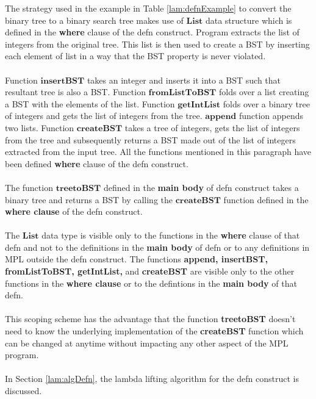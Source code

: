 \documentclass[11pt]{article}
\begin{document}
The strategy used in the example in Table \ref {lam:defnExample} to convert the binary tree to a binary search tree makes 
use of $\mathbf{List}$ data structure which is defined in the {\bf where} clause of the {\sf defn} construct. Program extracts the list of integers from the original tree. This list is then used to create a BST by inserting each element of list in a way that the BST property is never violated.
~~\\~~\\
Function $\mathbf{insertBST}$ takes an integer and inserts it into a BST such that resultant tree is also a BST. Function $\mathbf{fromListToBST}$ folds over a list creating a BST with the elements of the list. Function $\mathbf{getIntList}$ folds over a binary tree of integers and gets the list of integers from the tree. $\mathbf{append}$ function appends two lists. Function $\mathbf{createBST}$ takes a tree of integers, gets the list of integers from the tree and subsequently returns a BST made out of the list of integers extracted from the input tree. All the functions mentioned in this paragraph have been defined {\bf where} clause of the {\sf defn} construct.
~~\\~~\\
The function $\mathbf{treetoBST}$ defined in the {\bf main body} of {\sf defn} construct takes a binary tree and returns a BST by calling the $\mathbf{createBST}$ function defined in the {\bf where clause} of the {\sf defn} construct.
~~\\~~\\ 
The $\mathbf{List}$ data type is visible only to the functions in the {\bf where} clause of that {\sf defn} and not to the definitions in the {\bf main body} of {\sf defn} or to any definitions in MPL outside the {\sf defn} construct. The functions {\bf append, insertBST, fromListToBST, getIntList,} and {\bf createBST} are visible only to the other functions in the {\bf where clause} or to the defintions in the {\bf main body} of that {\sf defn}.
~~\\~~\\ 
This scoping scheme has the advantage that the function {\bf treetoBST} doesn't need to know the underlying implementation of the {\bf createBST} function which can be changed at anytime without impacting any other aspect of the MPL program.
~~\\~~\\ 
In Section \ref {lam:algDefn}, the lambda lifting algorithm for the {\sf defn} construct is discussed.
\end{document}
